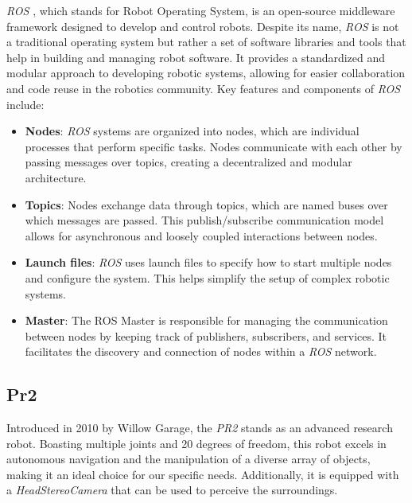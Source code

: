     \textit{ROS} \cite{ros}, which stands for Robot Operating System, is an open-source middleware framework designed to develop and control robots. Despite its name, \textit{ROS} \cite{ros} is not a traditional operating system but rather a set of software libraries and tools that help in building and managing robot software. It provides a standardized and modular approach to developing robotic systems, allowing for easier collaboration and code reuse in the robotics community.
    Key features and components of \textit{ROS} \cite{ros} include:
    \begin{itemize}
        \item \textbf{Nodes}: \textit{ROS} \cite{ros} systems are organized into nodes, which are individual processes that perform specific tasks. Nodes communicate with each other by passing messages over topics, creating a decentralized and modular architecture.
        \item \textbf{Topics}: Nodes exchange data through topics, which are named buses over which messages are passed. This publish/subscribe communication model allows for asynchronous and loosely coupled interactions between nodes.
        \item \textbf{Launch files}: \textit{ROS} \cite{ros} uses launch files to specify how to start multiple nodes and configure the system. This helps simplify the setup of complex robotic systems.
        \item \textbf{Master}: The ROS Master is responsible for managing the communication between nodes by keeping track of publishers, subscribers, and services. It facilitates the discovery and connection of nodes within a \textit{ROS} \cite{ros} network.
    \end{itemize}

    \subsection{Pr2}
	\label{sec:pr2}
	Introduced in 2010 by Willow Garage, the \textit{PR2} \cite{pr2} stands as an advanced research robot. Boasting multiple joints and 20 degrees of freedom, this robot excels in autonomous navigation and the manipulation of a diverse array of objects, making it an ideal choice for our specific needs. Additionally, it is equipped with a \textit{HeadStereoCamera} that can be used to perceive the surroundings.
	
